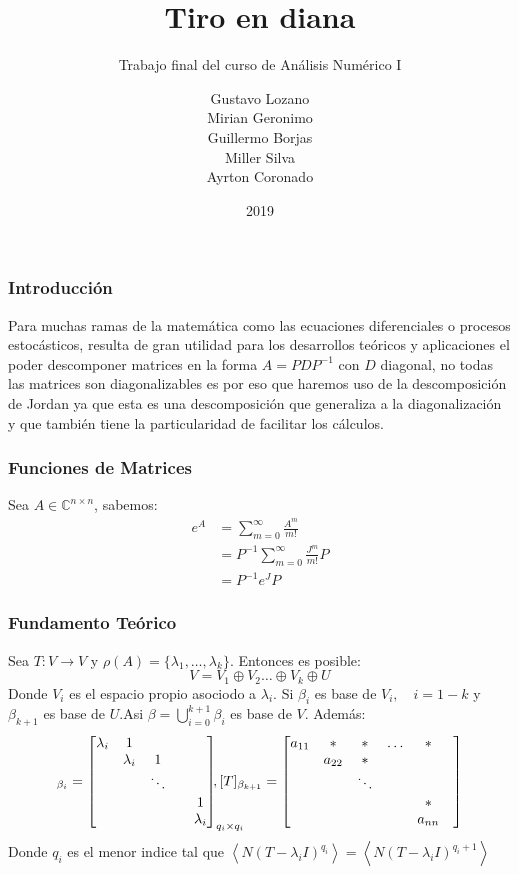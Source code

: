 \documentclass[utf8,spanish,xcolor={svgnames},12pt,handout]{beamer}
\title{Tiro en diana}
\subtitle{Trabajo final del curso de Análisis Numérico I}
\author[Lozano \\Geronimo \\Borjas \\Silva\\ Coronado]{Gustavo Lozano\\ Mirian Geronimo\\ Guillermo Borjas\\Miller Silva\\ Ayrton Coronado}
\date{2019}
\newcommand{\ds}{\displaystyle}
\begin{document}


\frame{\titlepage}
 
 
\begin{frame}
	\frametitle{Introducción}
 Para muchas ramas de la matemática como las ecuaciones diferenciales o procesos estocásticos, resulta de gran utilidad para los desarrollos teóricos y aplicaciones el poder descomponer matrices en la forma $A=PDP^{-1}$ con $D$ diagonal, no todas las matrices son diagonalizables es por eso que haremos uso de la descomposición de Jordan ya que esta es una
 descomposición que generaliza a la diagonalización y que también tiene la particularidad de facilitar los cálculos.
\end{frame}
 
\begin{frame}
	\frametitle{Funciones de Matrices}
	Sea $A\in\mathbb{C}^{n\times n}$, sabemos:
	\begin{align*}
	e^{A} 	&= \ds\sum_{m=0}^{\infty}\frac{A^{m}}{m!}\\
	&= P^{-1}\ds\sum_{m=0}^{\infty}\frac{J^{m}}{m!}P\\
	&= P^{-1}e^{J}P
	\end{align*}
\end{frame}



\begin{frame}
\frametitle{Fundamento Teórico}
Sea $T: V\rightarrow V$ y $\rho(A) = \{\lambda_{1},\ldots ,\lambda_{k}\}$. Entonces es posible:
$$V = V_{1}\oplus V_{2}\ldots\oplus V_{k}\oplus U$$
Donde $V_{i}$ es el espacio propio asociodo a $\lambda_{i}$.
Si $\beta_{i}$ es base de $V_{i},\quad i=1-k$ y $\beta_{k+1}$ es base de $U$.Asi $\beta = \bigcup_{i=0}^{k+1}\beta_{i}$ es base de $V$. Además:
\begin{equation*}
[T]_{\beta_{i}} = \begin{bmatrix}
\lambda_{i}	&	1	&	&	&\\
			&	\lambda_{i}	&	1	&	&\\
			&				&	\ddots	&	&\\
			&				&			&	&1\\
			&				&			&	&\lambda_{i}
\end{bmatrix}_{q_{i}\times q_{i}}
\hspace{-0.85cm}
,[T]_{\beta_{k+1}} = \begin{bmatrix}
a_{11}	&	*	& * &\ldots	&	*&\\
			&	a_{22}	&	*	&	&\\
			&				&	\ddots	&	&\\
			&				&			&	&*\\
			&				&			&	&a_{nn}
\end{bmatrix}
\end{equation*}
Donde $q_{i}$ es el menor indice tal que $\left<N(T-\lambda_{i}I)^{q_{i}}\right> = \left<N(T-\lambda_{i}I)^{q_{i}+1}\right>$
\end{frame}
\end{document}
